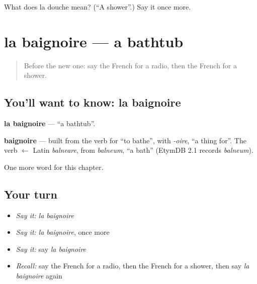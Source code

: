 \begin{tcolorbox}[breakable,colback=teal!4,colframe=teal!35!black,title={Before you move on}]
What does la douche mean? (\textquotedblleft{}A shower\textquotedblright{}.) Say it once more.
\end{tcolorbox}
\section[la baignoire]{la baignoire — a bathtub}

\label{lesson:FR-C112-baignoire}



\begin{quote}
Before the new one: say the French for a radio, then the French for a shower.
\end{quote}

\subsection*{You'll want to know: la baignoire}
\textbf{la baignoire} — \textquotedblleft{}a bathtub\textquotedblright{}.

\begin{cousinweb}
\textbf{baignoire} — built from the verb for \textquotedblleft{}to bathe\textquotedblright{}, with \emph{-oire}, \textquotedblleft{}a thing for\textquotedblright{}. The verb $\leftarrow$ Latin \emph{balneare}, from \emph{balneum}, \textquotedblleft{}a bath\textquotedblright{} (EtymDB 2.1 records \emph{balneum}).
\end{cousinweb}

\begin{grammarlens}[title={What you've built}]
One more word for this chapter.
\end{grammarlens}

\subsection*{Your turn}
\begin{itemize}
\raggedright
  \item \emph{Say it:} \emph{la baignoire}
  \item \emph{Say it:} \emph{la baignoire}, once more
  \item \emph{Say it:} say \emph{la baignoire}
  \item \emph{Recall:} say the French for a radio, then the French for a shower, then say \emph{la baignoire} again
\end{itemize}

